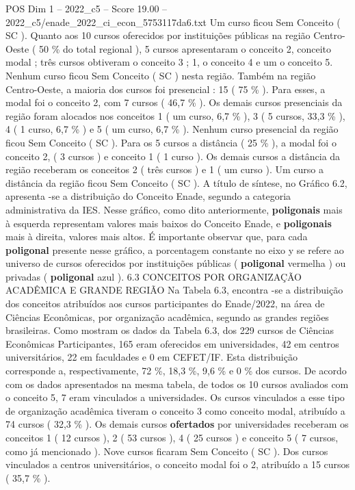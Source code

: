 \begin{textsample}{POS Dim 1 – 2022\_c5 – Score 19.00 – 2022\_c5/enade\_2022\_ci\_econ\_5753117da6.txt}
Um curso ficou Sem Conceito ( SC ).
Quanto aos 10 cursos oferecidos por instituições públicas na região Centro-Oeste ( 50 \% do total regional ), 5 cursos apresentaram o conceito 2, conceito modal ; três cursos obtiveram o conceito 3 ; 1, o conceito 4 e um o conceito 5.
Nenhum curso ficou Sem Conceito ( SC ) nesta região.
Também na região Centro-Oeste, a maioria dos cursos foi presencial : 15 ( 75 \% ).
Para esses, a modal foi o conceito 2, com 7 cursos ( 46,7 \% ).
Os demais cursos presenciais da região foram alocados nos conceitos 1 ( um curso, 6,7 \% ), 3 ( 5 cursos, 33,3 \% ), 4 ( 1 curso, 6,7 \% ) e 5 ( um curso, 6,7 \% ).
Nenhum curso presencial da região ficou Sem Conceito ( SC ).
Para os 5 cursos a distância ( 25 \% ), a modal foi o conceito 2, ( 3 cursos ) e conceito 1 ( 1 curso ).
Os demais cursos a distância da região receberam os conceitos 2 ( três cursos ) e 1 ( um curso ).
Um curso a distância da região ficou Sem Conceito ( SC ).
A título de síntese, no Gráfico 6.2, apresenta -se a distribuição do Conceito Enade, segundo a categoria administrativa da IES.
Nesse gráfico, como dito anteriormente, \textbf{poligonais} mais à esquerda representam valores mais baixos do Conceito Enade, e \textbf{poligonais} mais à direita, valores mais altos.
É importante observar que, para cada \textbf{poligonal} presente nesse gráfico, a porcentagem constante no eixo y se refere ao universo de cursos oferecidos por instituições públicas ( \textbf{poligonal} vermelha ) ou privadas ( \textbf{poligonal} azul ). 6.3 CONCEITOS POR ORGANIZAÇÃO ACADÊMICA E GRANDE REGIÃO Na Tabela 6.3, encontra -se a distribuição dos conceitos atribuídos aos cursos participantes do Enade/2022, na área de Ciências Econômicas, por organização acadêmica, segundo as grandes regiões brasileiras.
Como mostram os dados da Tabela 6.3, dos 229 cursos de Ciências Econômicas Participantes, 165 eram oferecidos em universidades, 42 em centros universitários, 22 em faculdades e 0 em CEFET/IF.
Esta distribuição corresponde a, respectivamente, 72 \%, 18,3 \%, 9,6 \% e 0 \% dos cursos.
De acordo com os dados apresentados na mesma tabela, de todos os 10 cursos avaliados com o conceito 5, 7 eram vinculados a universidades.
Os cursos vinculados a esse tipo de organização acadêmica tiveram o conceito 3 como conceito modal, atribuído a 74 cursos ( 32,3 \% ).
Os demais cursos \textbf{ofertados} por universidades receberam os conceitos 1 ( 12 cursos ), 2 ( 53 cursos ), 4 ( 25 cursos ) e conceito 5 ( 7 cursos, como já mencionado ).
Nove cursos ficaram Sem Conceito ( SC ).
Dos cursos vinculados a centros universitários, o conceito modal foi o 2, atribuído a 15 cursos ( 35,7 \% ).

\end{textsample}
